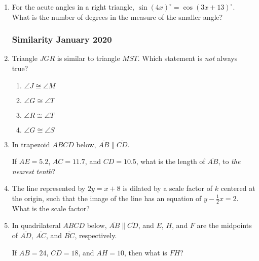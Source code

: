 \documentclass[12pt, twoside]{article}
\begin{document}
\begin{enumerate}[itemsep=0.5cm]
\newpage
\item For the acute angles in a right triangle, $\sin (4x)^\circ =\cos (3x +13)^\circ$. \\
What is the number of degrees in the measure of the smaller angle?

\newpage
\subsubsection*{Similarity \hfill January 2020}
\item Triangle $JGR$ is similar to triangle $MST$. Which statement is \emph{not}
always true?
\begin{multicols}{2}
  \begin{enumerate}
    \item $\angle J \cong \angle M$
    \item $\angle G \cong \angle T$ 
    \item $\angle R \cong \angle T$
    \item $\angle G \cong \angle S$
  \end{enumerate}
\end{multicols}

\item In trapezoid $ABCD$ below, $\overline{AB} \parallel \overline{CD}$.
\begin{center}
  \end{center}
If $AE=5.2$, $AC=11.7$, and $CD=10.5$, what is the length of $\overline{AB}$,
to \emph{the nearest tenth}?

\item The line represented by $2y=x+8$ is dilated by a scale factor
of $k$ centered at the origin, such that the image of the line has an
equation of $y - \frac{1}{2} x=2$. What is the scale factor?

\item In quadrilateral $ABCD$ below, $\overline{AB} \parallel \overline{CD}$, and $E$, $H$, and $F$ are the midpoints of $\overline{AD}$, $\overline{AC}$,  and $\overline{BC}$, respectively.
\begin{center}
  \end{center}
If $AB=24$, $CD=18$, and $AH=10$, then what is $FH$?


\end{enumerate}
\end{document}
